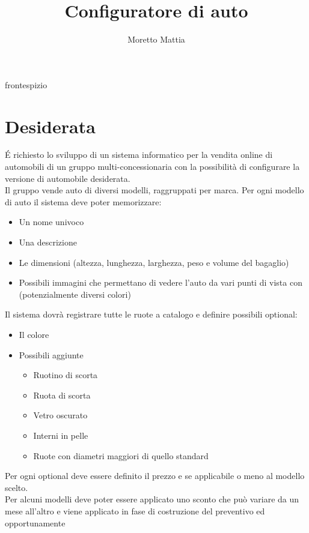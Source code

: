 \documentclass[a4paper, 11pt,oneside,]{book}
\title{Configuratore di auto}
\author{Moretto Mattia}
\newcommand{\add}[1]{{#1}}
\begin{document}
\add{frontespizio}

\begingroup
    \hypersetup{hidelinks}
    \tableofcontents
\endgroup


\chapter{Desiderata}
    \'E richiesto lo sviluppo di un sistema informatico per la vendita online di automobili di un gruppo multi-concessionaria con la possibilità di configurare la versione
    di automobile desiderata.\\
    Il gruppo vende auto di diversi modelli, raggruppati per marca. Per ogni modello di auto il sistema deve poter memorizzare:
    \begin{itemize}
        \item Un nome univoco
        \item Una descrizione
        \item Le dimensioni (altezza, lunghezza, larghezza, peso e volume del bagaglio)
        \item Possibili immagini che permettano di vedere l'auto da vari punti di vista con (potenzialmente diversi colori)
    \end{itemize}
    Il sistema dovrà registrare tutte le ruote a catalogo e definire possibili optional:
    \begin{itemize}
        \item Il colore
        \item Possibili aggiunte
        \begin{itemize}
            \item Ruotino di scorta
            \item Ruota di scorta
            \item Vetro oscurato
            \item Interni in pelle
            \item Ruote con diametri maggiori di quello standard
        \end{itemize}
    \end{itemize}
    Per ogni optional deve essere definito il prezzo e se applicabile o meno al modello scelto.\\
    Per alcuni modelli deve poter essere applicato uno sconto che può variare da un mese all'altro e viene applicato in fase di costruzione del preventivo ed opportunamente 
\end{document}
